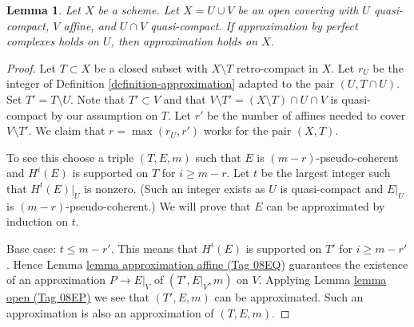 \documentclass{amsart}
\theoremstyle{plain}
\newtheorem{lemma}[subsection]{Lemma}
\theoremstyle{definition}
\theoremstyle{remark}
\numberwithin{equation}{subsection}
\begin{document}
\begin{lemma}
\label{lemma-induction-step}
Let $X$ be a scheme. Let $X = U \cup V$ be an open covering
with $U$ quasi-compact, $V$ affine, and $U \cap V$ quasi-compact.
If approximation by perfect complexes holds on $U$,
then approximation holds on $X$.
\end{lemma}

\begin{proof}
Let $T \subset X$ be a closed subset with $X \setminus T$ retro-compact
in $X$. Let $r_U$ be the integer of Definition \ref{definition-approximation}
adapted to the pair $(U, T \cap U)$.
Set $T' = T \setminus U$. Note that
$T' \subset V$ and that $V \setminus T' = (X \setminus T) \cap U \cap V$
is quasi-compact by our assumption on $T$.
Let $r'$ be the number of affines needed to cover $V \setminus T'$.
We claim that $r = \max(r_U, r')$ works for the pair $(X, T)$.

\medskip\noindent
To see this choose a triple $(T, E, m)$ such that $E$ is
$(m - r)$-pseudo-coherent and $H^i(E)$ is supported on $T$ for
$i \geq m - r$. Let $t$ be the largest integer such that
$H^t(E)|_U$ is nonzero. (Such an integer exists as $U$ is quasi-compact
and $E|_U$ is $(m - r)$-pseudo-coherent.)
We will prove that $E$ can be approximated by induction on $t$.

\medskip\noindent
Base case: $t \leq m - r'$. This means that $H^i(E)$ is supported
on $T'$ for $i \geq m - r'$. Hence
Lemma \href{https://stacks.math.columbia.edu/tag/08EQ}{lemma approximation affine (Tag 08EQ)}
guarantees the existence of an approximation
$P \to E|_V$ of $(T', E|_V, m)$ on $V$.
Applying Lemma \href{https://stacks.math.columbia.edu/tag/08EP}{lemma open (Tag 08EP)} we see that
$(T', E, m)$ can be approximated. Such an approximation
is also an approximation of $(T, E, m)$.


\end{proof}
\end{document}
